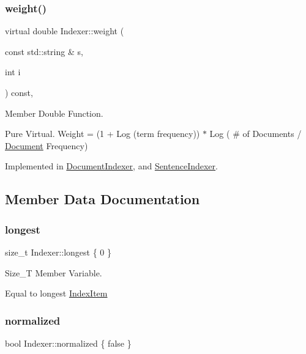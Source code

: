 \subsubsection{\texorpdfstring{weight()}{weight()}}
{\footnotesize\ttfamily virtual double Indexer\+::weight (\begin{DoxyParamCaption}\item[{const std\+::string \&}]{s,  }\item[{int}]{i }\end{DoxyParamCaption}) const\hspace{0.3cm}{\ttfamily [protected]}, {}}



Member Double Function. 

Pure Virtual. Weight = (1 + Log (term frequency)) $\ast$ Log ( \# of Documents / \hyperlink{class_document}{Document} Frequency) 

Implemented in \hyperlink{class_document_indexer_aa637e8bce87c52d0d78bfebe8af02f13}{Document\+Indexer}, and \hyperlink{class_sentence_indexer_ad436ab76195615090de457b50aabfe7b}{Sentence\+Indexer}.



\subsection{Member Data Documentation}
\mbox{\label{class_indexer_a605caf73d13945418d628d740468d86d}} 
\subsubsection{\texorpdfstring{longest}{longest}}
{\footnotesize\ttfamily size\+\_\+t Indexer\+::longest \{ 0 \}\hspace{0.3cm}{\ttfamily [protected]}}



Size\+\_\+T Member Variable. 

Equal to longest \hyperlink{class_index_item}{Index\+Item} \mbox{\label{class_indexer_a1345c9d490613f7b3a823ade15d7f68c}} 
\subsubsection{\texorpdfstring{normalized}{normalized}}
{\footnotesize\ttfamily bool Indexer\+::normalized \{ false \}\hspace{0.3cm}{\ttfamily [protected]}}



